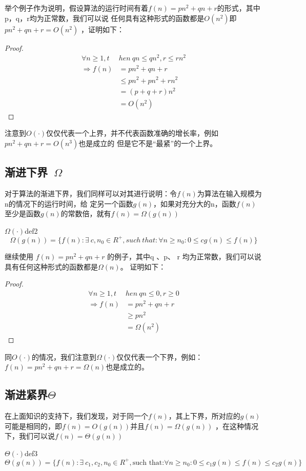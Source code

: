 举个例子作为说明，假设算法的运行时间有着$f(n)=pn^2+qn+r$的形式，其中p，q，r均为正常数，我们可以说
任何具有这种形式的函数都是$O(n^2)$即$pn^2+qn+r=O(n^2)$ ，证明如下：
\begin{proof}
	\begin{align*}
		\forall n \geq 1,t     & hen\ qn\leq qn^2,r\leq rn^2 \\
		\Longrightarrow   f(n) & =pn^2+qn+r                  \\
		                       & \leq pn^2+pn^2+rn^2         \\
		                       & =(p+q+r)n^2                 \\
		                       & = O(n^2)
	\end{align*}
\end{proof}
注意到$O(\cdot)$仅仅代表一个上界，并不代表函数准确的增长率，例如$pn^2+qn+r=O(n^3)$也是成立的
但是它不是“最紧”的一个上界。
\subsection{渐进下界\ $\Omega$}
对于算法的渐进下界，我们同样可以对其进行说明：令$f(n)$为算法在输入规模为n的情况下的运行时间，给
定另一个函数$g(n)$，如果对充分大的n，函数$f(n)$至少是函数$g(n)$的常数倍，就有$f(n)=\Omega(g(n))$
\begin{definition}{$\Omega(\cdot)$}{def2}
	\[
		\Omega (g(n))= \{f(n): \exists\ c,n_0\in R^+,such\ that: \forall n\ge n_0:0\le cg(n)\le f(n)\}
	\]
\end{definition}

继续使用 $f(n)=pn^2+qn+r$ 的例子，其中q 、p、 r 均为正常数，我们可以说具有任何这种形式的函数都是$\Omega(n)$。
证明如下：
\begin{proof}
	\begin{align*}
		\forall n \geq 1,t     & hen\ qn\leq 0,r\geq 0 \\
		\Longrightarrow   f(n) & =pn^2+qn+r            \\
		                       & \geq pn^2             \\
		                       & = \Omega (n^2)
	\end{align*}
\end{proof}

同$O(\cdot)$的情况，我们注意到$\Omega(\cdot)$仅仅代表一个下界，例如：$f(n)=pn^2+qn+r=\Omega(n)$也是成立的。

\subsection{渐进紧界$\Theta$}
在上面知识的支持下，我们发现，对于同一个$f(n)$，其上下界，所对应的$g(n)$可能是相同的，即$f(n)=O(g(n))$并且$f(n)=\Omega(g(n))$
，在这种情况下，我们可以说$f(n)=\Theta(g(n))$
\begin{definition}{$\Theta(\cdot)$}{def3}
	\[
		\Theta(g(n)) = \{f(n): \exists\ c_1,c_2,n_0\in R^+,\text{such that:} \forall n\ge n_0:0\le c_1 g(n)\le f(n)\le c_2 g(n)\}
	\]
\end{definition}

